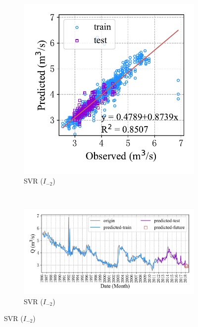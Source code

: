 \begin{figure}[!htbp]
\begin{subfigure}[b]{0.615\textwidth}
  \end{subfigure}
  \\
  \begin{subfigure}[b]{0.305\textwidth}
    \includegraphics[width=\textwidth]{Img/chap4_spr/spr_scatter_in_2_out_3_svr.pdf}
    \vspace{-1.2cm}
    \caption{SVR ($I_{-2}$)}
    \label{fig:spr_scatter_in_2_out_3_svr}
  \end{subfigure}
  ~
  \begin{subfigure}[b]{0.615\textwidth}
    \includegraphics[width=\textwidth]{Img/chap4_spr/spr_series_in_2_out_3_svr.pdf}
    \vspace{-1.2cm}
    \caption{SVR ($I_{-2}$)}
    \label{fig:spr_series_in_2_out_3_svr}

\end{subfigure}
\end{figure}
